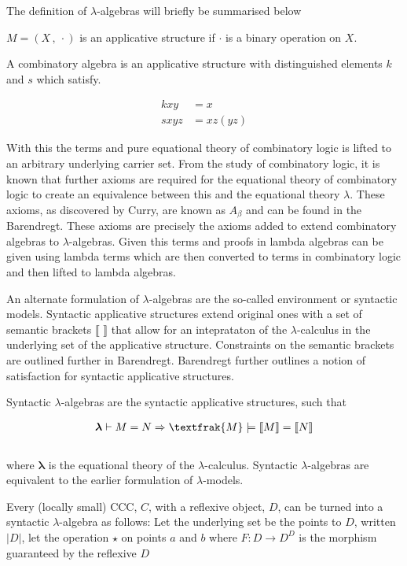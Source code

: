 \documentclass[a4paper,10pt]{article}
\begin{document}
The definition of $\lambda$-algebras will briefly be summarised below

$M = (X \, , \: \cdot)$ is an applicative structure if $\cdot$ is a binary operation on
$X$.


A combinatory algebra is an applicative structure with distinguished elements
$k$ and $s$ which satisfy.

\begin{align*}
kxy &= x \\
sxyz &= xz (yz)
\end{align*}

With this the terms and pure equational theory of combinatory logic is lifted to
an arbitrary underlying carrier set. From the study of combinatory logic, it is
known that further axioms are required for the equational theory of combinatory
logic to create an equivalence between this and the equational theory $\lambda$.
These axioms, as discovered by Curry, are known as $A_{\beta}$ and can be found
in the Barendregt. These axioms are precisely the axioms added to extend
combinatory algebras to $\lambda$-algebras. Given this terms and proofs in
lambda algebras can be given using lambda terms which are then converted to
terms in combinatory logic and then lifted to lambda algebras.


An alternate formulation of $\lambda$-algebras are the so-called environment or
syntactic models. Syntactic applicative structures extend original ones with a
set of semantic brackets $\llbracket  \, \, \rrbracket$ that allow for an
inteprataton of the $\lambda$-calculus in the underlying set of the applicative
structure. Constraints on the semantic brackets are outlined further in
Barendregt. Barendregt further outlines a notion of satisfaction for syntactic
applicative structures.

Syntactic $\lambda$-algebras are the syntactic applicative structures,
 such that

\begin{align*}
    \bm{\lambda} \vdash M = N \Rightarrow \textfrak{M} \models \llbracket M
    \rrbracket = \llbracket N \rrbracket
\end{align*}
\\

where $\bm{\lambda}$ is the equational theory of the $\lambda$-calculus.
Syntactic $\lambda$-algebras are equivalent to the earlier formulation of
$\lambda$-models.

Every (locally small) CCC, $C$, with a reflexive object, $D$, can be turned into
a syntactic $\lambda$-algebra as follows: Let the underlying set be the points
to $D$, written $|D|$, let the operation $\star$ on points $a$ and $b$ where $F
: D \rightarrow D^D$ is the morphism guaranteed by the reflexive $D$
\end{document}
